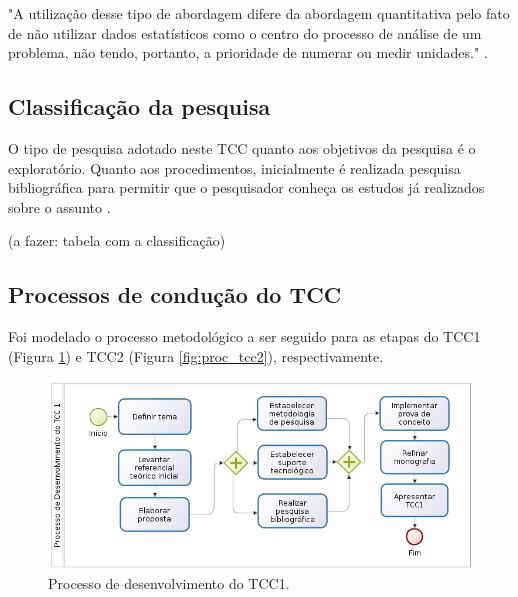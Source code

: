 \begin{citacao}
"A utilização desse tipo de abordagem difere da abordagem quantitativa pelo fato de não utilizar dados estatísticos como o centro do processo de análise de um problema, não tendo, portanto, a prioridade de numerar ou medir unidades." \cite{prodanov2013}.
\end{citacao}

\subsection{Classificação da pesquisa}


O tipo de pesquisa adotado neste TCC  quanto aos objetivos da pesquisa é o exploratório. Quanto aos procedimentos, inicialmente é realizada pesquisa bibliográfica para permitir que o pesquisador conheça os estudos já realizados sobre o assunto \cite[pág. 31]{fonseca}. 

(a fazer: tabela com a classificação)



\subsection{Processos de condução do TCC}

Foi modelado o processo metodológico a ser seguido para as etapas do TCC1 (Figura \ref{fig:proc_tcc1}) e TCC2 (Figura \ref{fig:proc_tcc2}), respectivamente.

\begin{figure}[!htb]
\centering
\includegraphics[scale=0.6]{figuras/processo_tcc1}
\caption{Processo de desenvolvimento do TCC1.}
\label{fig:proc_tcc1}
\end{figure}

